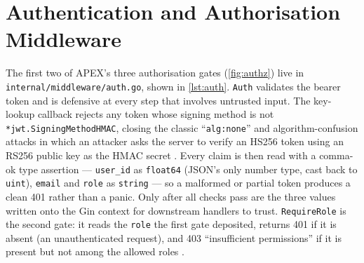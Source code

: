 \section{Authentication and Authorisation Middleware}\label{sec:ap-d-auth}

The first two of APEX's three authorisation gates (\cref{fig:authz}) live in \texttt{internal/middleware/auth.go}, shown in \cref{lst:auth}. \texttt{Auth} validates the bearer token and is defensive at every step that involves untrusted input. The key-lookup callback rejects any token whose signing method is not \texttt{*jwt.SigningMethodHMAC}, closing the classic ``\texttt{alg:none}'' and algorithm-confusion attacks in which an attacker asks the server to verify an HS256 token using an RS256 public key as the HMAC secret \cite{owasp-jwt}. Every claim is then read with a comma-ok type assertion --- \texttt{user\_id} as \texttt{float64} (JSON's only number type, cast back to \texttt{uint}), \texttt{email} and \texttt{role} as \texttt{string} --- so a malformed or partial token produces a clean 401 rather than a panic. Only after all checks pass are the three values written onto the Gin context for downstream handlers to trust. \texttt{RequireRole} is the second gate: it reads the \texttt{role} the first gate deposited, returns 401 if it is absent (an unauthenticated request), and 403 ``insufficient permissions'' if it is present but not among the allowed roles \cite{rfc7519,rfc6749}.

